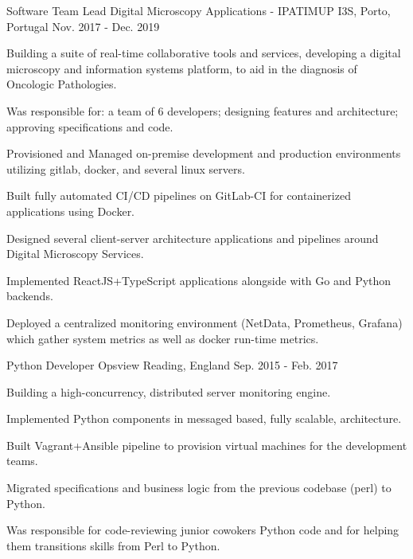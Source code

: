\begin{cventries}
  \cventry
    {Software Team Lead} %
    {Digital Microscopy Applications - IPATIMUP} %
    {I3S, Porto, Portugal} %
    {Nov. 2017 - Dec. 2019} %
    {
      \begin{cvitems} %
        \item {Building a suite of real-time collaborative tools and services, developing a digital microscopy and information systems platform, to aid in the diagnosis of Oncologic Pathologies. }
        \item {Was responsible for: a team of 6 developers; designing features and architecture; approving specifications and code.}
	\item {Provisioned and Managed on-premise development and production environments utilizing gitlab, docker, and several linux servers.}
        \item {Built fully automated CI/CD pipelines on GitLab-CI for containerized applications using Docker.}
        \item {Designed several client-server architecture applications and pipelines around Digital Microscopy Services.}
        \item {Implemented ReactJS+TypeScript applications alongside with Go and Python backends.}
        \item {Deployed a centralized monitoring environment (NetData, Prometheus, Grafana) which gather system metrics as well as docker run-time metrics.}
      \end{cvitems}
    }

  \cventry
    {Python Developer} %
    {Opsview} %
    {Reading, England} %
    {Sep. 2015 - Feb. 2017} %
    {
      \begin{cvitems} %
        \item {Building a high-concurrency, distributed server monitoring engine.}
        \item {Implemented Python components in messaged based, fully scalable, architecture.}
	\item {Built Vagrant+Ansible pipeline to provision virtual machines for the development teams.}
	\item {Migrated specifications and business logic from the previous codebase (perl) to Python.}
        \item {Was responsible for code-reviewing junior cowokers Python code and for helping them transitions skills from Perl to Python.}
      \end{cvitems}
    }


\end{cventries}
